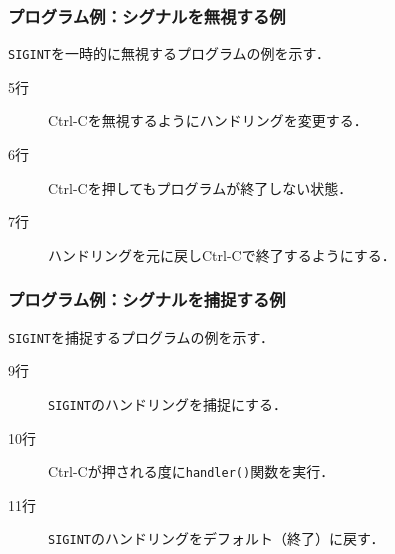 \documentclass{beamer}                 %
\begin{document}
\begin{frame}[fragile]
  \frametitle{プログラム例：シグナルを無視する例}
  \texttt{SIGINT}を一時的に無視するプログラムの例を示す．

  \begin{quote}
  \end{quote}

  \begin{description}
  \item[5行] Ctrl-Cを無視するようにハンドリングを変更する．
  \item[6行] Ctrl-Cを押してもプログラムが終了しない状態．
  \item[7行] ハンドリングを元に戻しCtrl-Cで終了するようにする．
  \end{description}
\end{frame}

\begin{frame}[fragile]
  \frametitle{プログラム例：シグナルを捕捉する例}
  \texttt{SIGINT}を捕捉するプログラムの例を示す．

  \begin{quote}
  \end{quote}

  \begin{description}
    \item[9行] \texttt{SIGINT}のハンドリングを捕捉にする．
    \item[10行] Ctrl-Cが押される度に\texttt{handler()}関数を実行．
    \item[11行] \texttt{SIGINT}のハンドリングをデフォルト（終了）に戻す．
  \end{description}
\end{frame}
\end{document}
